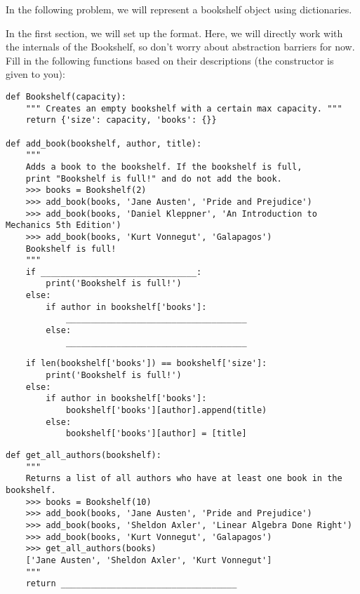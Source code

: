 \begin{blocksection}
\question
In the following problem, we will represent 
a bookshelf object using dictionaries.

In the first section, we will set up the format. Here, we will directly work with the internals of the
Bookshelf, so don't worry about abstraction barriers for now. Fill in the following functions based
on their descriptions (the constructor is given to you):

\begin{lstlisting}
def Bookshelf(capacity):
    """ Creates an empty bookshelf with a certain max capacity. """
    return {'size': capacity, 'books': {}}

def add_book(bookshelf, author, title):
    """
    Adds a book to the bookshelf. If the bookshelf is full,
    print "Bookshelf is full!" and do not add the book.
    >>> books = Bookshelf(2)
    >>> add_book(books, 'Jane Austen', 'Pride and Prejudice')
    >>> add_book(books, 'Daniel Kleppner', 'An Introduction to Mechanics 5th Edition')
    >>> add_book(books, 'Kurt Vonnegut', 'Galapagos')
    Bookshelf is full!
    """
    if _______________________________:
        print('Bookshelf is full!')
    else:
        if author in bookshelf['books']:
            ____________________________________
        else:
            ____________________________________
\end{lstlisting}
\end{blocksection}

\begin{solution}
    \begin{lstlisting}
    if len(bookshelf['books']) == bookshelf['size']:
        print('Bookshelf is full!')
    else:
        if author in bookshelf['books']:
            bookshelf['books'][author].append(title)
        else:
            bookshelf['books'][author] = [title]
    \end{lstlisting}
\end{solution}

\begin{blocksection}
\begin{lstlisting}
def get_all_authors(bookshelf):
    """
    Returns a list of all authors who have at least one book in the bookshelf.
    >>> books = Bookshelf(10)
    >>> add_book(books, 'Jane Austen', 'Pride and Prejudice')
    >>> add_book(books, 'Sheldon Axler', 'Linear Algebra Done Right')
    >>> add_book(books, 'Kurt Vonnegut', 'Galapagos')
    >>> get_all_authors(books)
    ['Jane Austen', 'Sheldon Axler', 'Kurt Vonnegut']
    """
    return ___________________________________
\end{lstlisting}
\end{blocksection}

